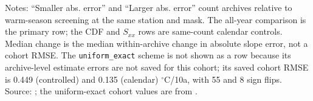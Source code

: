 \begin{table}[p]
{\begin{tabular}{llrrrrrr}
\bottomrule
\end{tabular}}
\par\smallskip\footnotesize Notes: ``Smaller abs. error'' and ``Larger abs. error'' count archives relative to warm-season screening at the same station and mask. The all-year comparison is the primary row; the CDF and $S_{xx}$ rows are same-count calendar controls. Median change is the median within-archive change in absolute slope error, not a cohort RMSE. The \texttt{uniform\_exact} scheme is not shown as a row because its archive-level estimate errors are not saved for this cohort; its saved cohort RMSE is 0.449 (controlled) and 0.135 (calendar) $^{\circ}$C/10a, with 55 and 8 sign flips. Source: ; the uniform-exact cohort values are from .
\end{table}
